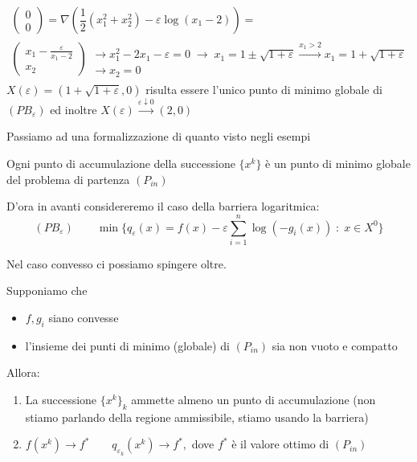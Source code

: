 \begin{example}
$$
\begin{array}{l}
\begin{pmatrix}
0 \\
0
\end{pmatrix}
=
\nabla (\dfrac{1}{2}(x_1^{2} + x_2^{2}) - \varepsilon \log(x_1 -2)) = \\
\begin{pmatrix}
  x_1 - \frac{\varepsilon}{x_1 -2} \\
 x_2
\end{pmatrix}
\begin{array}{ll}
 \rightarrow x_1^{2} - 2 x_1 - \varepsilon =0 \;  \rightarrow \;
x_1 = 1 \pm \sqrt{1+ \varepsilon} \xrightarrow{x_1 > 2}
x_1 = 1 + \sqrt{1+ \varepsilon}
  \\
 \rightarrow  x_2=0
\end{array}
\end{array}
$$
$X(\varepsilon) = (1 + \sqrt{1 + \varepsilon},0)$ risulta 
essere l'unico punto di minimo globale di $(PB_{\varepsilon})$
ed inoltre $X(\varepsilon) \xrightarrow{\varepsilon \downarrow 0}(2,0)$
\end{example}
Passiamo ad una formalizzazione di quanto visto negli esempi

\begin{theo}
Ogni punto di accumulazione della successione $\{x^{k}\}$
\`e un punto di minimo globale del problema di partenza
$(P_{in})$
\end{theo}
D'ora in avanti considereremo il caso della barriera logaritmica:
$$ (PB_{\varepsilon}) \qquad \min \{ q_\varepsilon(x) = f(x) - \displaystyle \varepsilon \sum_{i=1}^{n} \log(-g_i(x)) \; : \; x \in X^{0} \}$$

Nel caso convesso ci possiamo spingere oltre.
\begin{theo}
  Supponiamo che
  \begin{itemize}
  \item  $f, g_i$ siano convesse
    \item l'insieme dei punti di minimo (globale) di $(P_{in})$ sia
      non vuoto e compatto
  \end{itemize}
  Allora:
  \begin{enumerate}
  \item La successione $\{x^{k} \}_k$ ammette almeno un punto di accumulazione
    (non stiamo parlando della regione ammissibile, stiamo usando la
    barriera)
    \item
      $f(x^{k}) \rightarrow f^{*} \quad \text{} \quad q_{\varepsilon_{k}}(x^{k})\rightarrow f^{*}, $  dove $f^{*}$ \`e il valore ottimo di $(P_{in}) $
  \end{enumerate}
\end{theo}

